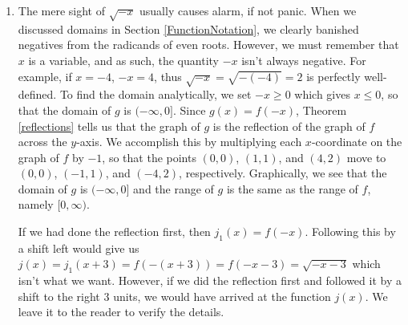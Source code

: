 {
\begin{enumerate}

\item  The mere sight of $\sqrt{-x}$ usually causes alarm, if not panic.  When we discussed domains in Section \ref{FunctionNotation}, we clearly banished negatives from the radicands of even roots.  However, we must remember that $x$ is a variable, and as such, the quantity $-x$ isn't always negative. For example, if $x=-4$, $-x = 4$, thus $\sqrt{-x} = \sqrt{-(-4)} = 2$ is perfectly well-defined.  To find the domain analytically, we set $-x \geq 0$ which gives  $x \leq 0$, so that the domain of $g$ is $(-\infty, 0]$.  Since $g(x) = f(-x)$, Theorem \ref{reflections} tells us that the graph of $g$ is the reflection of the graph of $f$ across the $y$-axis.  We accomplish this by multiplying each $x$-coordinate on the graph of $f$ by $-1$, so that the points $(0,0)$, $(1,1)$, and $(4,2)$ move to $(0,0)$, $(-1,1)$, and $(-4,2)$, respectively.  Graphically, we see that the domain of $g$ is $(-\infty, 0]$ and the range of $g$ is the same as the range of $f$, namely $[0,\infty)$.




If we had done the reflection first, then $j_{1}(x) = f(-x)$.  Following this by a shift left would give us $j(x) = j_{1}(x+3) = f(-(x+3)) = f(-x-3) = \sqrt{-x-3}$ which isn't what we want.  However, if we did the reflection first and followed it by a shift to the right $3$ units, we would have arrived at the function $j(x)$.  We leave it to the reader to verify the details.


\end{enumerate}}
